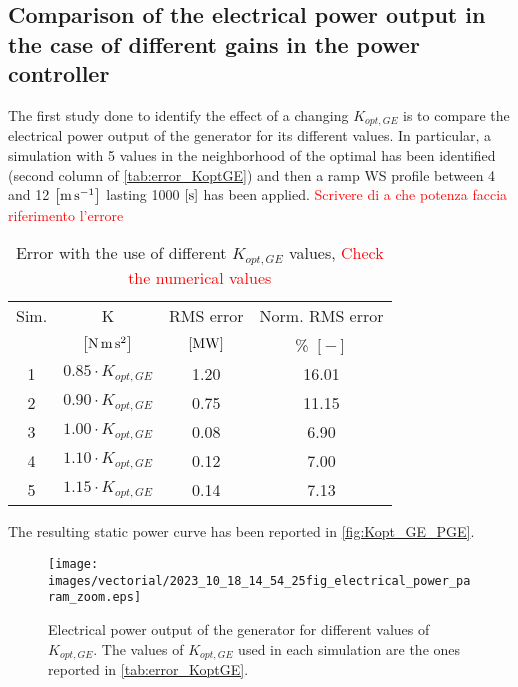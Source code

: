 \subsection{Comparison of the electrical power output in the case of different gains in the power controller}\label{subsec:c_different_KoptGE}
The first study done to identify the effect of a changing $K_{opt,GE}$ is to compare the electrical power output of the generator for its  different values. In particular, a simulation with 5 values in the neighborhood of the optimal has been identified (second column of \autoref{tab:error_KoptGE}) and then a ramp WS profile between 4 and 12 $\left[\si{\meter\per\second}\right]$ lasting 1000 $\left[\si{\second}\right]$ has been applied. \textcolor{red}{Scrivere di a che potenza faccia riferimento l'errore }
\begin{table}[htb]
  \caption{Error with the use of different $K_{opt,GE}$ values, \textcolor{red}{Check the numerical values}}
  \centering
  \begin{tabular}{cc|cc}
  \toprule
  Sim. & K & RMS error & Norm. RMS error\\ 
   &  $\left[\si{\newton \meter \square \second}\right]$ & $\left[\si{\mega\watt}\right]$ & \% $\left[-\right]$ \\ \midrule
  1 & $0.85\cdot K_{opt,GE}$  & 1.20 & 16.01\\
  2 & $0.90\cdot K_{opt,GE}$  & 0.75 & 11.15\\
  3 & $1.00\cdot K_{opt,GE}$  & 0.08 & 6.90 \\
  4 & $1.10\cdot K_{opt,GE}$  & 0.12 & 7.00 \\
  5 & $1.15\cdot K_{opt,GE}$  & 0.14 & 7.13 \\ \bottomrule
  \end{tabular}
  \label{tab:error_KoptGE}
\end{table}

The resulting static power curve has been reported in \autoref{fig:Kopt_GE_PGE}.
\begin{figure}
  \centering
  \texttt{[image: images/vectorial/2023\_10\_18\_14\_54\_25fig\_electrical\_power\_param\_zoom.eps]}
  \caption{Electrical power output of the generator for different values of $K_{opt,GE}$. The values of $K_{opt,GE}$ used in each simulation are the ones reported in \autoref{tab:error_KoptGE}.}
  \label{fig:Kopt_GE_PGE}
\end{figure}

